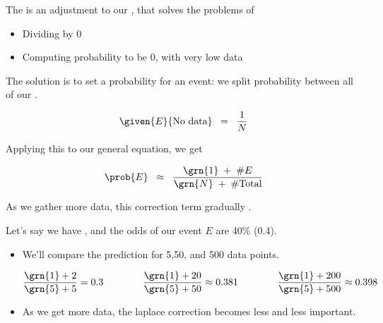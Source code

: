         \begin{definition}
            The  is an adjustment to our , that solves the problems of 

            \begin{itemize}
                \item Dividing by 0
                \item Computing probability to be 0, with very low data
            \end{itemize}

            The solution is to set a  probability for an event: we split probability  between all of our .

            \begin{equation*}
                \given{E}{\text{No data}} \;\;=\;\; \frac{1}{N}
            \end{equation*}

            Applying this to our general equation, we get

            \begin{equation*}
                \prob{E} \;\;\approx\;\; \frac{\grn{1}\;+\;\#E}{\grn{N} \;+\; \#\text{Total}}
            \end{equation*}

            As we gather more data, this correction term gradually .
        \end{definition}

        \miniex Let's say we have , and the odds of our event $E$ are 40\% (0.4).

        \begin{itemize}
            \item We'll compare the prediction for 5,50, and 500 data points.

            \begin{equation*}
                \frac{\grn{1}+2}{\grn{5}+5} = 0.3 \qquad \qquad 
                \frac{\grn{1}+20}{\grn{5}+50} \approx 0.381 \qquad \qquad
                \frac{\grn{1}+200}{\grn{5}+500} \approx 0.398
            \end{equation*}

            \item As we get more data, the laplace correction becomes less and less important.
        \end{itemize}


